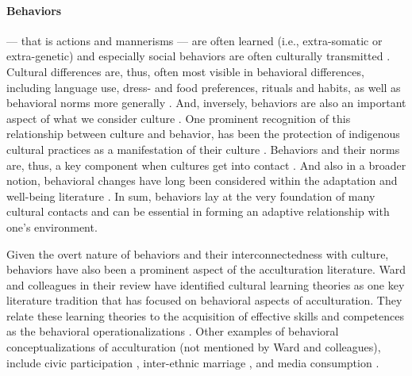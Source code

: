 \documentclass[nobib]{tufte-handout}
\begin{document}
\paragraph{Behaviors}--- that is actions and mannerisms --- are often learned (i.e., extra-somatic or extra-genetic) and especially social behaviors are often culturally transmitted \citep{Legare2019, Whiting1980}. Cultural differences are, thus, often most visible in behavioral differences, including language use, dress- and food preferences, rituals and habits, as well as behavioral norms more generally \citep[e.g., social norms, as well as formal rules and laws; e.g.,][]{Hofstede2001}. And, inversely, behaviors are also an important aspect of what we consider culture \citep[e.g.,][]{Varnum2017}. One prominent recognition of this relationship between culture and behavior, has been the protection of indigenous cultural practices as a manifestation of their culture \citep[Art. 11]{UnitedNations2007}. Behaviors and their norms are, thus, a key component when cultures get into contact \citep[also see][]{Maxwell2017, Sam2010}. And also in a broader notion, behavioral changes have long been considered within the adaptation and well-being literature \citep[e.g.,][]{Luhmann2012}. In sum, behaviors lay at the very foundation of many cultural contacts and can be essential in forming an adaptive relationship with one's environment.

Given the overt nature of behaviors and their interconnectedness with culture, behaviors have also been a prominent aspect of the acculturation literature. Ward and colleagues \citeyear{Ward2019} in their review have identified cultural learning theories as one key literature tradition that has focused on behavioral aspects of acculturation. They relate these learning theories to the acquisition of effective skills and competences as the behavioral operationalizations \citep[including, verbal and non-verbal communication skills][]{Ward2001}. Other examples of behavioral conceptualizations of acculturation (not mentioned by Ward and colleagues), include civic participation \citep[e.g., voting;][]{Lessard-Phillips2020}, inter-ethnic marriage \citep[e.g.,][]{Song2009}, and media consumption \citep[e.g.,][]{Shoemaker1985}. 
\end{document}
